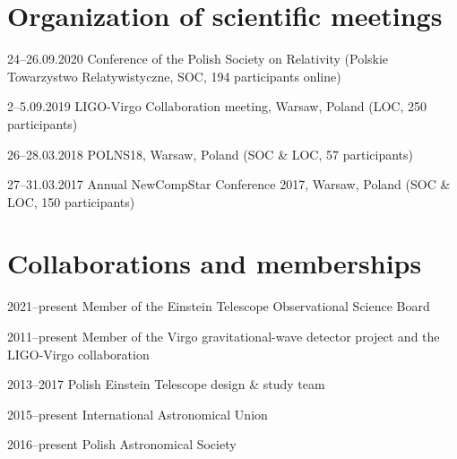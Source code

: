 \documentclass[]{friggeri-cv} %
\begin{document}
\vskip 0.5cm 
\section{Organization of scientific meetings}

\begin{entrylistshort}

\entrys
{24--26.09.2020}
{Conference of the Polish Society on Relativity (Polskie Towarzystwo Relatywistyczne, SOC, 194 participants online)} 

\entrys
{2--5.09.2019} 
{LIGO-Virgo Collaboration meeting, Warsaw, Poland (LOC, 250 participants)} 

\entrys
{26--28.03.2018} 
{POLNS18, Warsaw, Poland (SOC \& LOC, 57 participants)} 

\entrys
{27--31.03.2017} 
{Annual NewCompStar Conference 2017, Warsaw, Poland (SOC \& LOC, 150 participants)} 
 


\end{entrylistshort}


\vskip 0.5cm 
\section{Collaborations and memberships}

\begin{entrylistshort}

\entrys 
{2021--present} 
{Member of the Einstein Telescope Observational Science Board}

\entrys
{2011--present} 
{Member of the Virgo gravitational-wave detector project and the LIGO-Virgo collaboration}

\entrys
{2013--2017} 
{Polish Einstein Telescope design \& study team}

\entrys 
{2015--present}
{International Astronomical Union} 

\entrys
{2016--present}
{Polish Astronomical Society} 

\end{entrylistshort}



%
%
%
%
% 



\end{document}
